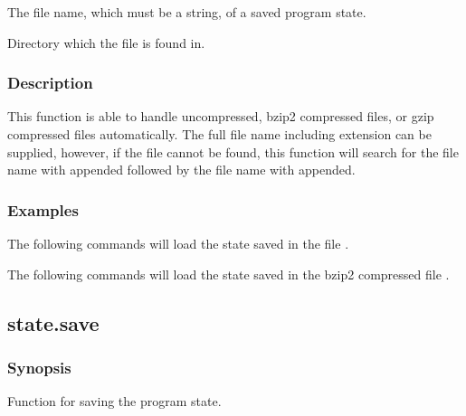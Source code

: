    The file name, which must be a string, of a saved program state.   

   Directory which the file is found in.  

  

  
 \subsubsection{Description} 

 This function is able to handle uncompressed, bzip2 compressed files, or gzip compressed files automatically.  The full file name including extension can be supplied, however, if the file cannot be found, this function will search for the file name with  appended followed by the file name with  appended. 
  

  
 \subsubsection{Examples} 

 The following commands will load the state saved in the file . 
  



 The following commands will load the state saved in the bzip2 compressed file . 
  





  

 \newpage 

 \subsection{state.save} 

  
 \subsubsection{Synopsis} 

 Function for saving the program state. 
  

